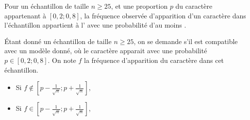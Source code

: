 \documentclass[12pt]{article}
\begin{document}

\begin{defprop}
  Pour un échantillon de taille $n\geq25$, et une proportion $p$ du
  caractère appartenant à $[0,2;0,8]$, la fréquence observée d'apparition d'un caractère dans l'échantillon appartient à l'  avec une probabilité d'au moins .
\end{defprop}

\begin{methode}
  Étant donné un échantillon de taille $n\geq25$, on se demande s'il est compatible avec un modèle donné, où le caractère apparait avec une probabilité $p\in\left[ 0,2;0,8 \right]$. On note $f$ la fréquence d'apparition du caractère dans cet échantillon.
  \begin{itemize}
    \item Si $f\notin\left[ p-\frac{1}{\sqrt{n}};p+\frac{1}{\sqrt{n}} \right]$, \phantom{on peut rejeter l'hypothèse que l'échantillon soit compatible avec le modèle.}\\[1cm]
    \item Si $f\in\left[ p-\frac{1}{\sqrt{n}};p+\frac{1}{\sqrt{n}} \right]$, \phantom{on ne peut pas rejeter l'hypothèse que l'échantillon soit compatible avec le modèle.}
  \end{itemize}
\end{methode}
\end{document}
